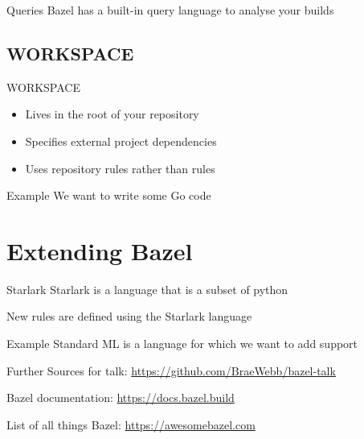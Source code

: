 \documentclass[aspectratio=169]{beamer}
\begin{document}
\begin{body-slide}{Queries}
Bazel has a built-in query language to analyse your builds
\end{body-slide}

\subsection{WORKSPACE}

\begin{body-slide}{WORKSPACE}
\begin{itemize}[<+-|alert@+>]
    \color{UQCSBlue}
    \item Lives in the root of your repository
    \item Specifies external project dependencies
    \item Uses repository rules rather than rules
\end{itemize}
\end{body-slide}

\begin{body-slide}{Example}
We want to write some Go code
\end{body-slide}


\section{Extending Bazel}

\begin{body-slide}{Starlark}
Starlark is a language that is a subset of python

New rules are defined using the Starlark language
\end{body-slide}

\begin{body-slide}{Example}
Standard ML is a language for which we want to add support
\end{body-slide}

\begin{body-slide}{Further}
Sources for talk: \url{https://github.com/BraeWebb/bazel-talk}

Bazel documentation: \url{https://docs.bazel.build}

List of all things Bazel: \url{https://awesomebazel.com}
\end{body-slide}
\end{document}
